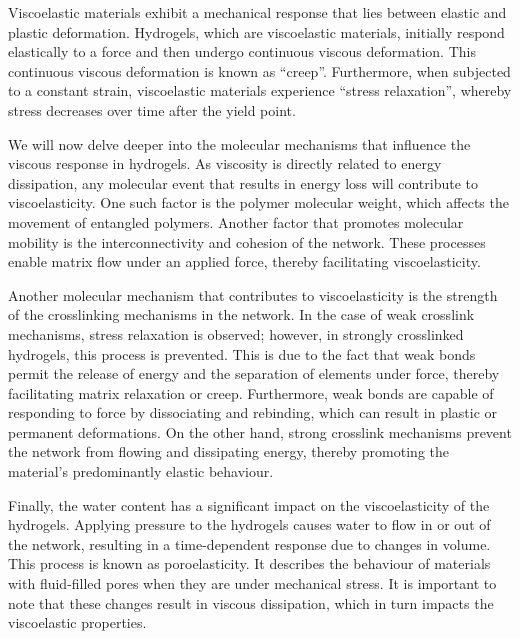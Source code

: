 Viscoelastic materials exhibit a mechanical response that lies between elastic and plastic deformation.
Hydrogels, which are viscoelastic materials, initially respond elastically to a force and then undergo continuous viscous deformation.
This continuous viscous deformation is known as ``creep''.
Furthermore, when subjected to a constant strain, viscoelastic materials experience ``stress relaxation'', whereby stress decreases over time after the yield point.

We will now delve deeper into the molecular mechanisms that influence the viscous response in hydrogels.
As viscosity is directly related to energy dissipation, any molecular event that results in energy loss will contribute to viscoelasticity.
One such factor is the polymer molecular weight, which affects the movement of entangled polymers.
Another factor that promotes molecular mobility is the interconnectivity and cohesion of the network.
These processes enable matrix flow under an applied force, thereby facilitating viscoelasticity.

Another molecular mechanism that contributes to viscoelasticity is the strength of the crosslinking mechanisms in the network.
In the case of weak crosslink mechanisms, stress relaxation is observed; however, in strongly crosslinked hydrogels, this process is prevented. 
This is due to the fact that weak bonds permit the release of energy and the separation of elements under force, thereby facilitating matrix relaxation or creep.
Furthermore, weak bonds are capable of responding to force by dissociating and rebinding, which can result in plastic or permanent deformations.
On the other hand, strong crosslink mechanisms prevent the network from flowing and dissipating energy, thereby promoting the material's predominantly elastic behaviour.

Finally, the water content has a significant impact on the viscoelasticity of the hydrogels.
Applying pressure to the hydrogels causes water to flow in or out of the network, resulting in a time-dependent response due to changes in volume.
This process is known as poroelasticity. It describes the behaviour of materials with fluid-filled pores when they are under mechanical stress.
It is important to note that these changes result in viscous dissipation, which in turn impacts the viscoelastic properties.


